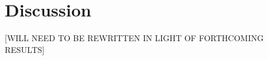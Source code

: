 \documentclass[12pt]{article}
\begin{document}

\section{Discussion}\label{sec:discuss}

[WILL NEED TO BE REWRITTEN IN LIGHT OF FORTHCOMING RESULTS]
\end{document}
